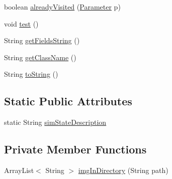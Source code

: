 \begin{DoxyCompactItemize}
\item 
boolean \hyperlink{classit_1_1isislab_1_1masonhelperdocumentation_1_1analizer_1_1_sim_state_analizer_a384f244c6d532ff8120eb40868a97989}{already\-Visited} (\hyperlink{classit_1_1isislab_1_1masonhelperdocumentation_1_1analizer_1_1_parameter}{Parameter} p)
\item 
void \hyperlink{classit_1_1isislab_1_1masonhelperdocumentation_1_1analizer_1_1_sim_state_analizer_a149346cbdf3b1f0d06c783d09103850e}{test} ()
\item 
String \hyperlink{classit_1_1isislab_1_1masonhelperdocumentation_1_1analizer_1_1_sim_state_analizer_a40662d69fe3007c3a074d257c2c40dac}{get\-Fields\-String} ()
\item 
String \hyperlink{classit_1_1isislab_1_1masonhelperdocumentation_1_1analizer_1_1_sim_state_analizer_abc95a350e9935fa01ac2fa2344372472}{get\-Class\-Name} ()
\item 
String \hyperlink{classit_1_1isislab_1_1masonhelperdocumentation_1_1analizer_1_1_sim_state_analizer_adc78b00761532b2b5cc84a075a1adc5f}{to\-String} ()
\end{DoxyCompactItemize}
\subsection*{Static Public Attributes}
\begin{DoxyCompactItemize}
\item 
static String \hyperlink{classit_1_1isislab_1_1masonhelperdocumentation_1_1analizer_1_1_sim_state_analizer_a313d35aaf7e8bc171ddf8b0a7912ca6c}{sim\-State\-Description}
\end{DoxyCompactItemize}
\subsection*{Private Member Functions}
\begin{DoxyCompactItemize}
\item 
Array\-List$<$ String $>$ \hyperlink{classit_1_1isislab_1_1masonhelperdocumentation_1_1analizer_1_1_sim_state_analizer_a5f11914d44cbe2bac31cee77bb9598f5}{img\-In\-Directory} (String path)
\end{DoxyCompactItemize}
